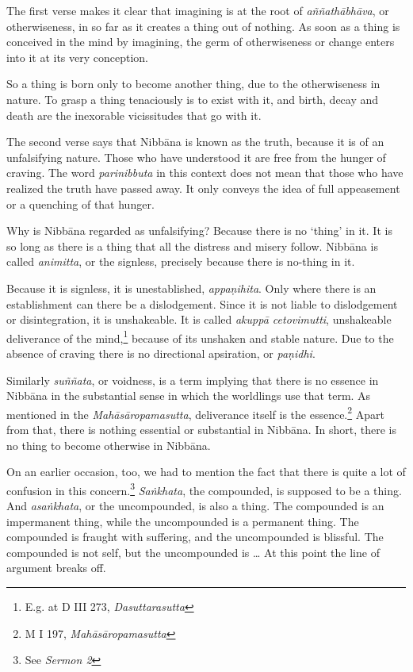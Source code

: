 The first verse makes it clear that imagining is at the root of \emph{aññathābhāva}, or otherwiseness, in so far as it creates a thing out of nothing. As soon as a thing is conceived in the mind by imagining, the germ of otherwiseness or change enters into it at its very conception.

So a thing is born only to become another thing, due to the otherwiseness in nature. To grasp a thing tenaciously is to exist with it, and birth, decay and death are the inexorable vicissitudes that go with it.

The second verse says that Nibbāna is known as the truth, because it is of an unfalsifying nature. Those who have understood it are free from the hunger of craving. The word \emph{parinibbuta} in this context does not mean that those who have realized the truth have passed away. It only conveys the idea of full appeasement or a quenching of that hunger.

Why is Nibbāna regarded as unfalsifying? Because there is no `thing' in it. It is so long as there is a thing that all the distress and misery follow. Nibbāna is called \emph{animitta}, or the signless, precisely because there is no-thing in it.

Because it is signless, it is unestablished, \emph{appaṇihita}. Only where there is an establishment can there be a dislodgement. Since it is not liable to dislodgement or disintegration, it is unshakeable. It is called \emph{akuppā cetovimutti}, unshakeable deliverance of the mind,\footnote{E.g. at D III 273, \emph{Dasuttarasutta}} because of its unshaken and stable nature. Due to the absence of craving there is no directional apsiration, or \emph{paṇidhi}.

Similarly \emph{suññata}, or voidness, is a term implying that there is no essence in Nibbāna in the substantial sense in which the worldlings use that term. As mentioned in the \emph{Mahāsāropamasutta}, deliverance itself is the essence.\footnote{M I 197, \emph{Mahāsāropamasutta}} Apart from that, there is nothing essential or substantial in Nibbāna. In short, there is no thing to become otherwise in Nibbāna.

On an earlier occasion, too, we had to mention the fact that there is quite a lot of confusion in this concern.\footnote{See \emph{Sermon 2}} \emph{Saṅkhata}, the compounded, is supposed to be a thing. And \emph{asaṅkhata}, or the uncompounded, is also a thing. The compounded is an impermanent thing, while the uncompounded is a permanent thing. The compounded is fraught with suffering, and the uncompounded is blissful. The compounded is not self, but the uncompounded is \ldots{} At this point the line of argument breaks off.

